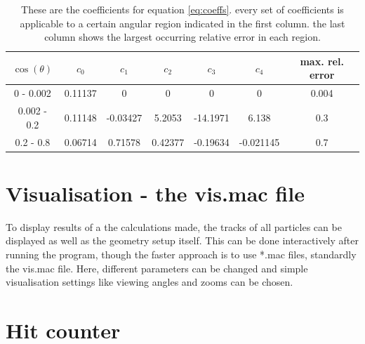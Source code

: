   \begin{table}
  \centering
  	\begin{tabular}{|c|c|c|c|c|c|c|}
  	\hline
  		$\cos{\left(\theta\right)}$ & $c_0$ & $c_1$ & $c_2$ & $c_3$ & $c_4$ & max. rel. error\\
  		\hline
  		0 - 0.002 & 0.11137 & 0 & 0 & 0 & 0 & 0.004\\
	
  		0.002 - 0.2 & 0.11148 & -0.03427 & 5.2053 & -14.1971 & 6.138 & 0.3\\
  		0.2 - 0.8 & 0.06714 & 0.71578 & 0.42377 & -0.19634 & -0.021145 & 0.7\\
  		\hline
  	\end{tabular}
	\caption[Angular distribution coefficients]{These are the coefficients for equation \ref{eq:coeffs}. every set of coefficients is applicable to a certain angular region indicated in the first column. the last column shows the largest occurring relative error in each region. }
  \end{table}




  
  \section{Visualisation - the vis.mac file}
  \label{ch:Simulation software:sec:Visualisation}
  
  To display results of a the calculations made, the tracks of all particles can be displayed as well as the geometry setup itself. This can be done interactively after running the program, though the faster approach is to use *.mac files, standardly the vis.mac file. Here, different parameters can be changed and simple visualisation settings like viewing angles and zooms can be chosen.
  
  
  \section{Hit counter}
  \label{ch:Simulation software:sec:Hit counter}
  
